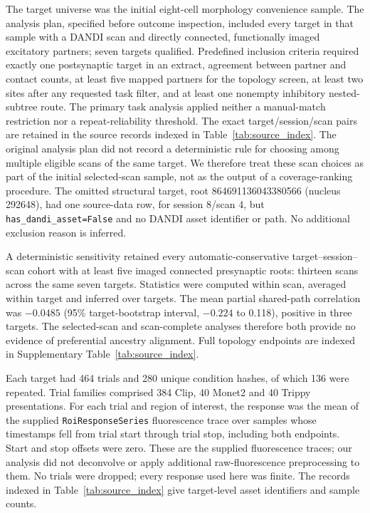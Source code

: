 The target universe was the initial eight-cell morphology convenience sample.
The analysis plan, specified before outcome inspection, included every target
in that sample with a DANDI scan and directly connected, functionally imaged
excitatory partners; seven targets qualified. Predefined inclusion criteria
required exactly one postsynaptic target in an
extract, agreement between partner and contact counts, at least five mapped
partners for the topology screen, at least two sites after any requested task
filter, and at least one nonempty inhibitory nested-subtree route. The primary
task analysis applied neither a manual-match restriction nor a repeat-reliability
threshold. The exact target/session/scan pairs are retained in the source records indexed in Table~\ref{tab:source_index}. The original analysis plan did not record a
deterministic rule for choosing among multiple eligible scans of the same
target. We therefore treat these scan choices as part of the initial
selected-scan sample, not as the output of a coverage-ranking procedure.
The omitted structural target, root 864691136043380566 (nucleus 292648), had
one source-data row, for session 8/scan 4, but
\texttt{has\_dandi\_asset=False} and no DANDI asset identifier or path. No
additional exclusion reason is inferred.

A deterministic sensitivity retained every automatic-conservative target--session--scan cohort with at least five imaged connected presynaptic roots: thirteen scans across the same seven targets. Statistics were computed within scan, averaged within target and inferred over targets. The mean partial shared-path correlation was $-0.0485$ (95\% target-bootstrap interval, $-0.224$ to 0.118), positive in three targets. The selected-scan and scan-complete analyses therefore both provide no evidence of preferential ancestry alignment. Full topology endpoints are indexed in Supplementary Table~\ref{tab:source_index}.

Each target had 464 trials and 280 unique condition hashes, of which 136 were
repeated. Trial families comprised 384 Clip, 40 Monet2 and 40 Trippy
presentations. For each trial and region of interest, the response was the
mean of the supplied \texttt{RoiResponseSeries} fluorescence trace over samples whose timestamps
fell from trial start through trial stop, including both endpoints. Start and
stop offsets were zero. These are the supplied fluorescence traces; our analysis did not deconvolve or apply additional raw-fluorescence preprocessing to them. No trials were dropped; every response used here was
finite. The records indexed in Table~\ref{tab:source_index} give target-level asset identifiers
and sample counts.

